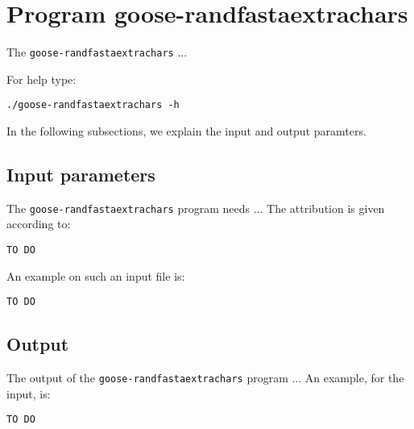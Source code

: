 \section{Program goose-randfastaextrachars}
The \texttt{goose-randfastaextrachars} ...

For help type:
\begin{lstlisting}
./goose-randfastaextrachars -h
\end{lstlisting}
In the following subsections, we explain the input and output paramters.

\subsection{Input parameters}

The \texttt{goose-randfastaextrachars} program needs ...
The attribution is given according to:
\begin{lstlisting}
TO DO
\end{lstlisting}

An example on such an input file is:
\begin{lstlisting}
TO DO
\end{lstlisting}

\subsection{Output}
The output of the \texttt{goose-randfastaextrachars} program ...
An example, for the input, is:
\begin{lstlisting}
TO DO
\end{lstlisting}